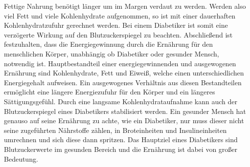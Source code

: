 \documentclass[a4paper,11pt]{article}%
\renewcommand{\\}{\vspace*{0.5\baselineskip} \newline}
\begin{document}
		Fettige Nahrung benötigt länger um im Margen verdaut zu werden. Werden also viel Fett und viele Kohlenhydrate aufgenommen, so ist mit einer dauerhaften Kohlenhydratzufuhr gerechnet werden. Bei einem Diabetiker ist somit eine verzögerte Wirkung auf den Blutzuckerspiegel zu beachten.\cite{SG}\\
		Abschließend ist festzuhalten, dass die Energiegewinnung durch die Ernährung für den menschlichen Körper, unabhängig ob Diabetiker oder gesunder Mensch, notwendig ist. Hauptbestandteil einer energiegewinnenden und ausgewogenen Ernährung sind Kohlenhydrate, Fett und Eiweiß, welche einen unterschiedlichen Energiegehalt aufweisen. Ein ausgewogenes Verhältnis aus diesen Bestandteilen ermöglicht eine längere Energiezufuhr für den Körper und ein längeres Sättigungsgefühl. Durch eine langsame Kohlenhydrataufnahme kann auch der Blutzuckerspiegel eines Diabetikers stabilisiert werden. Ein gesunder Mensch hat genauso auf seine Ernährung zu achte, wie ein Diabetiker, nur muss dieser nicht seine zugeführten Nährstoffe zählen, in Broteinheiten und Insulineinheiten umrechnen und sich diese dann spritzen. Das Hauptziel eines Diabetikers sind Blutzuckerwerte im gesunden Bereich und die Ernährung ist dabei von großer Bedeutung.
\end{document}
